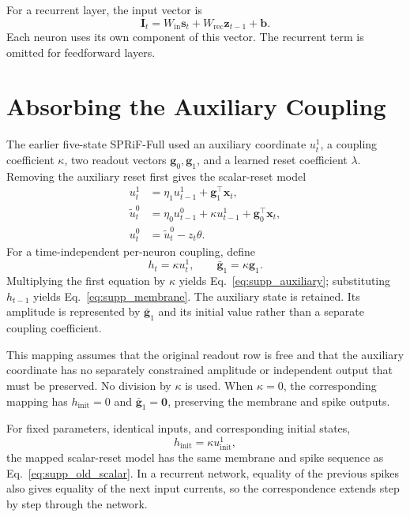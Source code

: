 \documentclass[letterpaper]{article}
\begin{document}
For a recurrent layer, the input vector is
\begin{equation}
\mathbf I_t=W_{\mathrm{in}}\mathbf s_t+W_{\mathrm{rec}}\mathbf z_{t-1}+\mathbf b.
\label{eq:supp_current}
\end{equation}
Each neuron uses its own component of this vector. The recurrent term is omitted for feedforward layers.

\section{Absorbing the Auxiliary Coupling}
\label{supp:sec:reparameterization}

The earlier five-state SPRiF-Full used an auxiliary coordinate $u_t^1$, a coupling coefficient $\kappa$, two readout vectors $\mathbf g_0,\mathbf g_1$, and a learned reset coefficient $\lambda$. Removing the auxiliary reset first gives the scalar-reset model
\begin{align}
u_t^1&=\eta_1u_{t-1}^1+\mathbf g_1^\top\mathbf x_t,\\
\widetilde u_t^0&=\eta_0u_{t-1}^0+\kappa u_{t-1}^1+\mathbf g_0^\top\mathbf x_t,\\
u_t^0&=\widetilde u_t^0-z_t\theta.
\label{eq:supp_old_scalar}
\end{align}
For a time-independent per-neuron coupling, define
\begin{equation}
h_t=\kappa u_t^1,\qquad \bar{\mathbf g}_1=\kappa\mathbf g_1.
\label{eq:supp_mapping}
\end{equation}
Multiplying the first equation by $\kappa$ yields Eq.~\eqref{eq:supp_auxiliary}; substituting $h_{t-1}$ yields Eq.~\eqref{eq:supp_membrane}. The auxiliary state is retained. Its amplitude is represented by $\bar{\mathbf g}_1$ and its initial value rather than a separate coupling coefficient.

This mapping assumes that the original readout row is free and that the auxiliary coordinate has no separately constrained amplitude or independent output that must be preserved. No division by $\kappa$ is used. When $\kappa=0$, the corresponding mapping has $h_{\mathrm{init}}=0$ and $\bar{\mathbf g}_1=\mathbf0$, preserving the membrane and spike outputs.

For fixed parameters, identical inputs, and corresponding initial states,
\begin{equation}
h_{\mathrm{init}}=\kappa u_{\mathrm{init}}^1,
\label{eq:supp_initial_mapping}
\end{equation}
the mapped scalar-reset model has the same membrane and spike sequence as Eq.~\eqref{eq:supp_old_scalar}. In a recurrent network, equality of the previous spikes also gives equality of the next input currents, so the correspondence extends step by step through the network.
\end{document}
